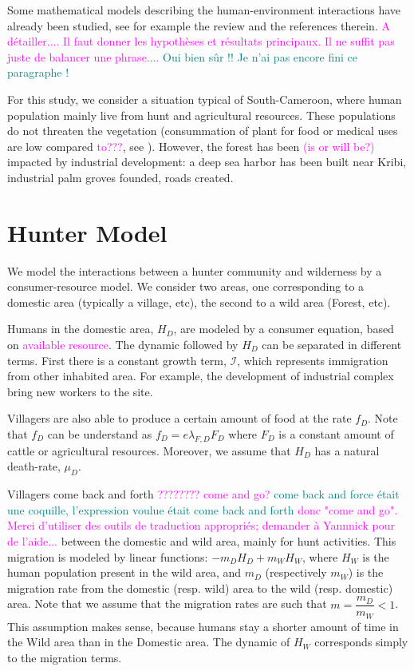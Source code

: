 \documentclass{article}
\newcommand{\lfd}{\lambda_{F, D}}
\newcommand{\cI}{\mathcal{I}}
\newcommand{\marc}[1]{\textcolor{teal}{#1}}
\newcommand{\YD}[1]{\textcolor{magenta}{#1}}
\begin{document}
Some mathematical models describing the human-environment interactions have already been studied, see for example the review \cite{fanuel_modelling_2023} and the references therein. \YD{A détailler.... Il faut donner les hypothèses et résultats principaux. Il ne suffit pas juste de balancer une phrase....} \marc{Oui bien sûr !! Je n'ai pas encore fini ce paragraphe !}

For this study, we consider a situation typical of South-Cameroon, where human population mainly live from hunt and agricultural resources. These populations do not threaten the vegetation (consummation of plant for food or medical uses are low compared \YD{to???}, see \cite{koppert_consommation_1996}). However, the forest has been \YD{(is or will be?)} impacted by industrial development: a deep sea harbor has been built near Kribi, industrial palm groves founded, roads created.

\section{Hunter Model}

We model the interactions between a hunter community and wilderness by a consumer-resource model. We consider two areas, one corresponding to a domestic area (typically a village, etc), the second to a wild area (Forest, etc).

Humans in the domestic area, $H_D$, are modeled by a consumer equation, based on \YD{available resource}. The dynamic followed by $H_D$ can be separated in different terms. 
First there is a constant growth term, $\cI$, which represents immigration from other inhabited area. For example, the development of industrial complex bring new workers to the site.

Villagers are also able to produce a certain amount of food at the rate $f_D$. Note that $f_D$ can be understand as $f_D = e \lfd F_D$ where $F_D$ is a constant amount of cattle or agricultural resources. 
Moreover, we assume that $H_D$ has a natural death-rate, $\mu_D$.

Villagers come back and forth \YD{???????? come and go?} \marc{come back and force était une coquille, l'expression voulue était come back and forth} \YD{donc "come and go". Merci d'utiliser des outils de traduction appropriés; demander à Yannnick pour de l'aide...} between the domestic and wild area, mainly for hunt activities. This migration is modeled by linear functions: $-m_D H_D + m_W H_W$, where $H_W$ is the human population present in the wild area, and $m_D$ (respectively $m_W$) is the migration rate from the domestic (resp. wild) area to the wild (resp. domestic) area. Note that we assume that the migration rates are such that $m = \dfrac{m_D}{m_W} < 1$. This assumption makes sense, because humans stay a shorter amount of time in the Wild area than in the Domestic area.
The dynamic of $H_W$ corresponds simply to the migration terms. 
\end{document}
